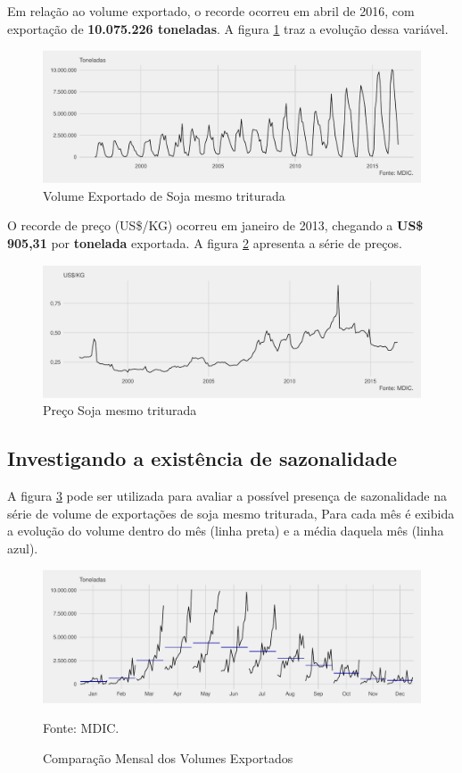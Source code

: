 \documentclass[portuguese,]{article}
\newcommand{\source}[1]{{
	\begin{flushleft}
		 \scriptsize{Fonte: {#1}}
	\end{flushleft}
 }}
\begin{document}
Em relação ao volume exportado, o recorde ocorreu em abril de 2016, com
exportação de \textbf{10.075.226 toneladas}. A figura \ref{fig:fig2}
traz a evolução dessa variável.

\begin{figure}[H]
\includegraphics{exemplo_pdf_files/figure-latex/fig2-1} \caption{Volume Exportado de Soja mesmo triturada}\label{fig:fig2}
\end{figure}

O recorde de preço (US\$/KG) ocorreu em janeiro de 2013, chegando a
\textbf{US\$ 905,31} por \textbf{tonelada} exportada. A figura
\ref{fig:fig3} apresenta a série de preços.

\begin{figure}[H]
\includegraphics{exemplo_pdf_files/figure-latex/fig3-1} \caption{Preço Soja mesmo triturada}\label{fig:fig3}
\end{figure}

\subsection{Investigando a existência de
sazonalidade}\label{investigando-a-existencia-de-sazonalidade}

A figura \ref{fig:fig4} pode ser utilizada para avaliar a possível
presença de sazonalidade na série de volume de exportações de soja mesmo
triturada, Para cada mês é exibida a evolução do volume dentro do mês
(linha preta) e a média daquela mês (linha azul).

\begin{figure}[H]
\includegraphics{exemplo_pdf_files/figure-latex/fig4-1}
\caption{Comparação Mensal dos Volumes Exportados}\label{fig:fig4}
\source{MDIC.}
\end{figure}
\end{document}
